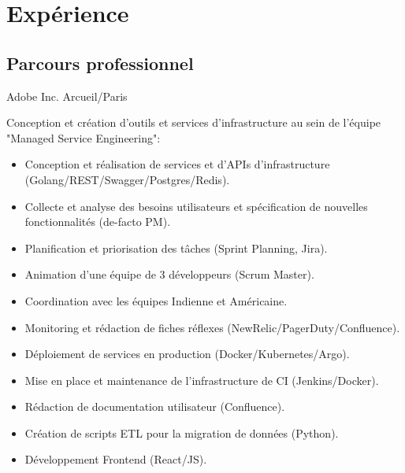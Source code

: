 \documentclass[10pt,a4paper,sans]{moderncv}        %
\begin{document}
\maketitle


\section{Expérience}
\subsection{Parcours professionnel}

        {Adobe Inc.}
        {Arcueil/Paris}
        {}
        {}

        {}
        {}
        {}
        {Conception et création d'outils et services d'infrastructure au sein de l'équipe "Managed Service Engineering":
            \begin{itemize}
            \item Conception et réalisation de services et d'APIs d'infrastructure (Golang/REST/Swagger/Postgres/Redis).
            \item Collecte et analyse des besoins utilisateurs et spécification de nouvelles fonctionnalités (de-facto PM).
            \item Planification et priorisation des tâches (Sprint Planning, Jira).
            \item Animation d'une équipe de 3 développeurs (Scrum Master).
            \item Coordination avec les équipes Indienne et Américaine.
            \item Monitoring et rédaction de fiches réflexes (NewRelic/PagerDuty/Confluence).
            \item Déploiement de services en production (Docker/Kubernetes/Argo).
            \item Mise en place et maintenance de l'infrastructure de CI (Jenkins/Docker).
            \item Rédaction de documentation utilisateur (Confluence).
            \item Création de scripts ETL pour la migration de données (Python).
            \item Développement Frontend (React/JS).
            \end{itemize}
        }
\end{document}
